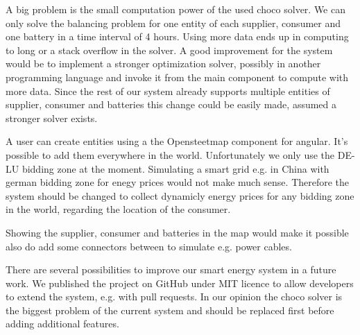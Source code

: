 A big problem is the small computation power of the used choco solver.
We can only solve the balancing problem for one entity of each supplier, consumer and one battery in a time interval of 4 hours.
Using more data ends up in computing to long or a stack overflow in the solver.
A good improvement for the system would be to implement a stronger optimization solver, possibly in another programming language and invoke it from the main component to compute with more data.
Since the rest of our system already supports multiple entities of supplier, consumer and batteries this change could be easily made, assumed a stronger solver exists.

A user can create entities using a the Opensteetmap component for angular.
It's possible to add them everywhere in the world.
Unfortunately we only use the DE-LU bidding zone at the moment.
Simulating a smart grid e.g. in China with german bidding zone for enegy prices would not make much sense.
Therefore the system should be changed to collect dynamicly energy prices for any bidding zone in the world, regarding the location of the consumer. 

Showing the supplier, consumer and batteries in the map would make it possible also do add some connectors between to simulate e.g. power cables.

There are several possibilities to improve our smart energy system in a future work.
We published the project on GitHub under MIT licence to allow developers to extend the system, e.g. with pull requests.
In our opinion the choco solver is the biggest problem of the current system and should be replaced first before adding additional features.